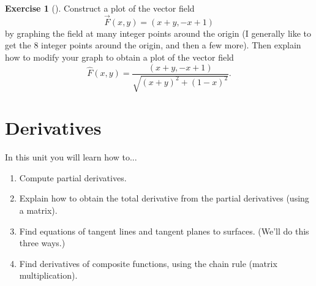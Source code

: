 \documentclass[10pt,]{book}
\theoremstyle{plain}
\theoremstyle{definition}
\theoremstyle{definition}
\theoremstyle{definition}
\theoremstyle{definition}
\newtheorem{exploration}[project]{Exercise}
\theoremstyle{definition}
\numberwithin{equation}{section}
\begin{document}
\begin{exploration}[]\label{exploration-129}
Construct a plot of the vector field%
\begin{equation*}
\vec F(x,y) = (x+y, -x+1)
\end{equation*}
by graphing the field at many integer points around the origin (I generally like to get the 8 integer points around the origin, and then a few more). Then explain how to modify your graph to obtain a plot of the vector field%
\begin{equation*}
\hat F(x,y) = \frac{(x+y, -x+1)}{\sqrt{(x+y)^2+(1-x)^2}}.
\end{equation*}
%
\end{exploration}
\typeout{************************************************}
\typeout{************************************************}
\chapter[{Derivatives}]{Derivatives}\label{chapter-7}
In this unit you will learn how to... \leavevmode%
\begin{enumerate}
\item\hypertarget{li-67}{}Compute partial derivatives.%
\item\hypertarget{li-68}{}Explain how to obtain the total derivative from the partial derivatives (using a matrix).%
\item\hypertarget{li-69}{}Find equations of tangent lines and tangent planes to surfaces. (We'll do this three ways.)%
\item\hypertarget{li-70}{}Find derivatives of composite functions, using the chain rule (matrix multiplication).%
\end{enumerate}
%
\typeout{************************************************}
\typeout{************************************************}
\end{document}

